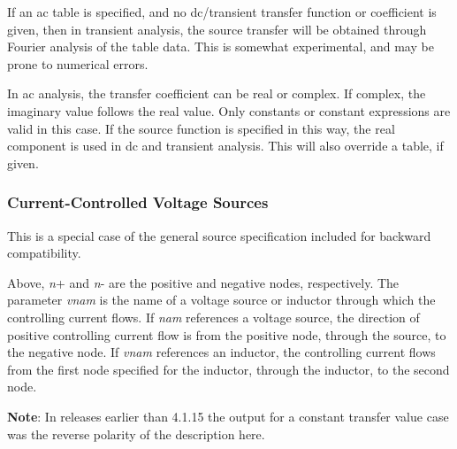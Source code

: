 If an ac table is specified, and no dc/transient transfer function or
coefficient is given, then in transient analysis, the source transfer
will be obtained through Fourier analysis of the table data.  This is
somewhat experimental, and may be prone to numerical errors.

In ac analysis, the transfer coefficient can be real or complex.  If
complex, the imaginary value follows the real value.  Only constants
or constant expressions are valid in this case.  If the source
function is specified in this way, the real component is used in dc
and transient analysis.  This will also override a table, if given.

\subsubsection{Current-Controlled Voltage Sources}


This is a special case of the general source specification included
for backward compatibility.


Above, {\it n\/}{\vt +} and {\it n\/}{\vt -} are the positive and
negative nodes, respectively.  The parameter {\it vnam} is the name
of a voltage source or inductor through which the controlling current
flows.  If {\it nam} references a voltage source, the direction of
positive controlling current flow is from the positive node, through
the source, to the negative node.  If {\it vnam\/} references an
inductor, the controlling current flows from the first node specified
for the inductor, through the inductor, to the second node.

{\bf Note}:  In releases earlier than 4.1.15 the output for a constant
transfer value case was the reverse polarity of the description here.

